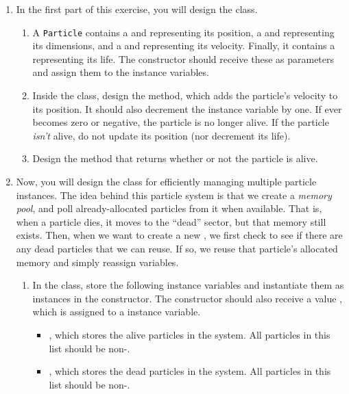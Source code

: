 \begin{enumerate}[label=(\alph*)]
  \item In the first part of this exercise, you will design the  class.
  \begin{enumerate}[label=(\roman*)]
    \item A \texttt{Particle} contains a  and  representing its position, a  and  representing its dimensions, and a  and  representing its velocity. Finally, it contains a  representing its life. The constructor should receive these as parameters and assign them to the instance variables.
    \item Inside the  class, design the  method, which adds the particle's velocity to its position. It should also decrement the  instance variable by one. If  ever becomes zero or negative, the particle is no longer alive. If the particle \emph{isn't} alive, do not update its position (nor decrement its life).
    \item Design the  method that returns whether or not the particle is alive.
  \end{enumerate}
  \item Now, you will design the  class for efficiently managing multiple particle instances. The idea behind this particle system is that we create a \emph{memory pool}, and poll already-allocated particles from it when available. That is, when a particle dies, it moves to the ``dead'' sector, but that memory still exists. Then, when we want to create a new , we first check to see if there are any dead particles that we can reuse. If so, we reuse that particle's allocated memory and simply reassign variables. 
  \begin{enumerate}[label=(\roman*)]
    \item In the  class, store the following instance variables and instantiate them as  instances in the constructor. The constructor should also receive a value , which is assigned to a  instance variable.
    \begin{itemize}
      \item {}, which stores the alive particles in the system. All particles in this list should be non-.
      \item {}, which stores the dead particles in the system. All particles in this list should be non-.

\end{itemize}
\end{enumerate}
\end{enumerate}
